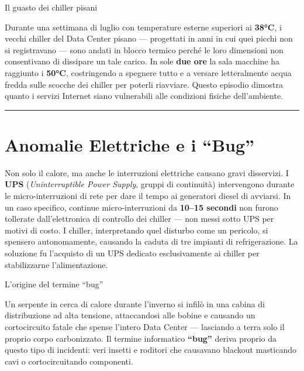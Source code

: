 \documentclass[
  italian,
  openany]{book}
\begin{document}
\begin{callouttip}{Il guasto dei chiller pisani}

Durante una settimana di luglio con temperature esterne superiori ai
\textbf{38°C}, i vecchi chiller del Data Center pisano --- progettati in
anni in cui quei picchi non si registravano --- sono andati in blocco
termico perché le loro dimensioni non consentivano di dissipare un tale
carico. In sole \textbf{due ore} la sala macchine ha raggiunto i
\textbf{50°C}, costringendo a spegnere tutto e a versare letteralmente
acqua fredda sulle scocche dei chiller per poterli riavviare. Questo
episodio dimostra quanto i servizi Internet siano vulnerabili alle
condizioni fisiche dell'ambiente.

\end{callouttip}

\begin{center}\rule{0.5\linewidth}{0.5pt}\end{center}

\section{Anomalie Elettriche e i
``Bug''}\label{anomalie-elettriche-e-i-bug}

Non solo il calore, ma anche le interruzioni elettriche causano gravi
disservizi. I \textbf{UPS} (\emph{Uninterruptible Power Supply}, gruppi
di continuità) intervengono durante le micro-interruzioni di rete per
dare il tempo ai generatori diesel di avviarsi. In un caso specifico,
continue micro-interruzioni da \textbf{10--15 secondi} non furono
tollerate dall'elettronica di controllo dei chiller --- non messi sotto
UPS per motivi di costo. I chiller, interpretando quel disturbo come un
pericolo, si spensero autonomamente, causando la caduta di tre impianti
di refrigerazione. La soluzione fu l'acquisto di un UPS dedicato
esclusivamente ai chiller per stabilizzarne l'alimentazione.

\begin{callouttip}{L’origine del termine “bug”}

Un serpente in cerca di calore durante l'inverno si infilò in una cabina
di distribuzione ad alta tensione, attaccandosi alle bobine e causando
un cortocircuito fatale che spense l'intero Data Center --- lasciando a
terra solo il proprio corpo carbonizzato. Il termine informatico
\textbf{``bug''} deriva proprio da questo tipo di incidenti: veri
insetti e roditori che causavano blackout masticando cavi o
cortocircuitando componenti.

\end{callouttip}
\end{document}
